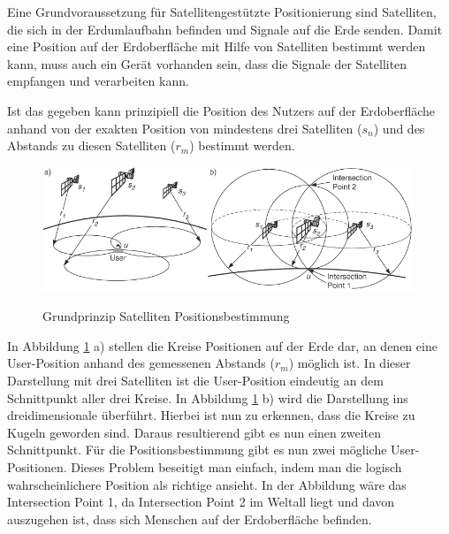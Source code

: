 Eine Grundvoraussetzung für Satellitengestützte Positionierung sind Satelliten, die sich in der Erdumlaufbahn befinden und Signale auf die Erde senden. Damit eine Position auf der Erdoberfläche mit Hilfe von Satelliten bestimmt werden kann, muss auch ein Gerät vorhanden sein, dass die Signale der Satelliten empfangen und verarbeiten kann.

Ist das gegeben kann prinzipiell die Position des Nutzers auf der Erdoberfläche anhand von der exakten Position von mindestens drei Satelliten ($s_{n}$) und des Abstands zu diesen Satelliten ($r_{m}$) bestimmt werden.

\cite[S. 188]{Schiller2004}


\begin{figure}[h]
\centering
\includegraphics[width=0.99\textwidth]{ref/images/prinzip_satelliten.png}
\caption[Grundprinzip Satelliten Positionsbestimmung]{Grundprinzip Satelliten Positionsbestimmung}
\label{fig:Grundprinzip Satelliten}
\cite[S. 188]{Schiller2004}
\end{figure}

In Abbildung \ref{fig:Grundprinzip Satelliten} a) stellen die Kreise Positionen auf der Erde dar, an denen eine User-Position anhand des gemessenen Abstands ($r_{m}$) möglich ist. In dieser Darstellung mit drei Satelliten ist die User-Position eindeutig an dem Schnittpunkt aller drei Kreise. 
In Abbildung \ref{fig:Grundprinzip Satelliten} b) wird die Darstellung ins dreidimensionale überführt. Hierbei ist nun zu erkennen, dass die Kreise zu Kugeln geworden sind. Daraus resultierend gibt es nun einen zweiten Schnittpunkt. Für die Positionsbestimmung gibt es nun zwei mögliche User-Positionen. Dieses Problem beseitigt man einfach, indem man die logisch wahrscheinlichere Position als richtige ansieht. In der Abbildung wäre das Intersection Point 1, da Intersection Point 2 im Weltall liegt und davon auszugehen ist, dass sich Menschen auf der Erdoberfläche befinden.
\cite[S. 188]{Schiller2004}

